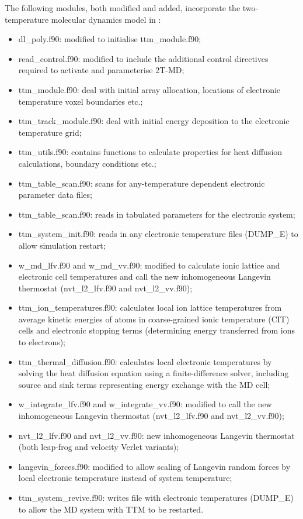The following modules, both modified and added, incorporate the
two-temperature molecular dynamics model in \D:
\begin{itemize}
	\item  {\sc dl\_poly.f90}: modified to initialise {\sc ttm\_module.f90};
	\item  {\sc read\_control.f90}: modified to include the additional control directives required to activate and parameterise 2T-MD;
	\item  {\sc ttm\_module.f90}: deal with initial array allocation, locations of electronic temperature voxel boundaries etc.;
	\item  {\sc ttm\_track\_module.f90}: deal with initial energy deposition to the electronic temperature grid;
	\item  {\sc ttm\_utils.f90}: contains functions to calculate properties for heat diffusion calculations, boundary conditions etc.;
	\item  {\sc ttm\_table\_scan.f90}: scans for any-temperature dependent electronic parameter data files;
	\item  {\sc ttm\_table\_scan.f90}: reads in tabulated parameters for the electronic system;
	\item  {\sc ttm\_system\_init.f90}: reads in any electronic temperature files (DUMP\_E) to allow simulation restart;
	\item  {\sc w\_md\_lfv.f90} and {\sc w\_md\_vv.f90}: modified to calculate ionic lattice and electronic cell temperatures and call the new inhomogeneous Langevin thermostat ({\sc nvt\_l2\_lfv.f90} and {\sc nvt\_l2\_vv.f90});
	\item  {\sc ttm\_ion\_temperatures.f90}: calculates local ion lattice temperatures from average kinetic energies of atoms in coarse-grained ionic temperature (CIT) cells and electronic stopping terms (determining energy transferred from ions to electrons);
	\item  {\sc ttm\_thermal\_diffusion.f90}: calculates local electronic temperatures by solving the heat diffusion equation using a finite-difference solver, including source and sink terms representing energy exchange with the MD cell;
	\item  {\sc w\_integrate\_lfv.f90} and {\sc w\_integrate\_vv.f90}: modified to call the new inhomogeneous Langevin thermostat ({\sc nvt\_l2\_lfv.f90} and {\sc nvt\_l2\_vv.f90});
	\item  {\sc nvt\_l2\_lfv.f90} and {\sc nvt\_l2\_vv.f90}: new inhomogeneous Langevin thermostat (both leap-frog and velocity Verlet variants);
	\item {\sc langevin\_forces.f90}: modified to allow scaling of Langevin random forces by local electronic temperature instead of system temperature;
    \item  {\sc ttm\_system\_revive.f90}: writes file with electronic temperatures (DUMP\_E) to allow the MD system with TTM to be restarted.
\end{itemize}

